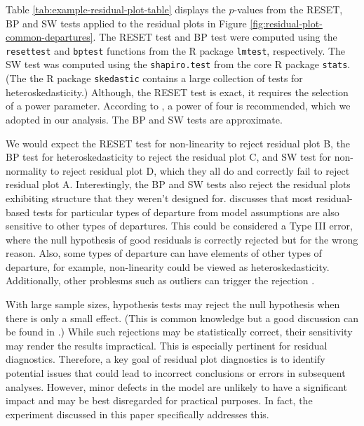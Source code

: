 \documentclass[]{interact}
\theoremstyle{plain}%
\theoremstyle{definition}
\theoremstyle{remark}
\begin{document}
Table \ref{tab:example-residual-plot-table} displays the \(p\)-values
from the RESET, BP and SW tests applied to the residual plots in Figure
\ref{fig:residual-plot-common-departures}. The RESET test and BP test
were computed using the \texttt{resettest} and \texttt{bptest} functions
from the R package \texttt{lmtest}, respectively. The SW test was
computed using the \texttt{shapiro.test} from the core R package
\texttt{stats}. (The the R package \texttt{skedastic} \citep{skedastic}
contains a large collection of tests for heteroskedasticity.) Although,
the RESET test is exact, it requires the selection of a power parameter.
According to \citet{ramsey_tests_1969}, a power of four is recommended,
which we adopted in our analysis. The BP and SW tests are approximate.

We would expect the RESET test for non-linearity to reject residual plot
B, the BP test for heteroskedasticity to reject the residual plot C, and
SW test for non-normality to reject residual plot D, which they all do
and correctly fail to reject residual plot A. Interestingly, the BP and
SW tests also reject the residual plots exhibiting structure that they
weren't designed for. \citet{cook1982residuals} discusses that most
residual-based tests for particular types of departure from model
assumptions are also sensitive to other types of departures. This could
be considered a Type III error, where the null hypothesis of good
residuals is correctly rejected but for the wrong reason. Also, some
types of departure can have elements of other types of departure, for
example, non-linearity could be viewed as heteroskedasticity.
Additionally, other problesms such as outliers can trigger the rejection
\citep{cook_applied_1999}.

With large sample sizes, hypothesis tests may reject the null hypothesis
when there is only a small effect. (This is common knowledge but a good
discussion can be found in \citet{kirk1996}.) While such rejections may
be statistically correct, their sensitivity may render the results
impractical. This is especially pertinent for residual diagnostics.
Therefore, a key goal of residual plot diagnostics is to identify
potential issues that could lead to incorrect conclusions or errors in
subsequent analyses. However, minor defects in the model are unlikely to
have a significant impact and may be best disregarded for practical
purposes. In fact, the experiment discussed in this paper specifically
addresses this.
\end{document}
